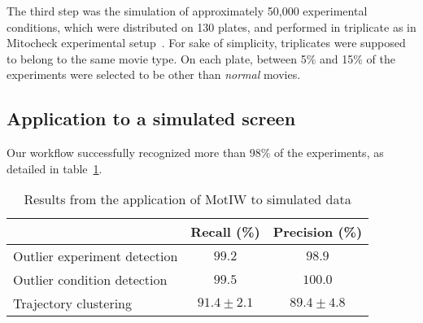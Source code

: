 The third step was the simulation of approximately 50,000 experimental
conditions, which were distributed on 130 plates, and performed in
triplicate as in Mitocheck experimental
setup~\cite{pmid20360735}. For sake of simplicity, triplicates were
supposed to belong to the same movie type. On
each plate, between 5\% and 15\% of the experiments were selected to
be other than \textit{normal} movies. 
%
%


\subsection{Application to a simulated screen}
Our workflow successfully recognized more than 98\% of the experiments, as detailed in table~\ref{simu_results}.
\begin{table}[!ht]
\centering
\caption{Results from the application of MotIW to simulated data\label{simu_results}}
{\begin{tabular}{l|c|c|}
 & Recall (\%)& Precision (\%)\\
\hline
\parbox{5cm}{Outlier experiment detection} & $99.2$ & $98.9$\\
\parbox{5cm}{Outlier condition detection} & $99.5$ & $100.0$\\
\hline
\hline
Trajectory clustering & $91.4\pm2.1$ &  $89.4\pm4.8$\\
\hline
\end{tabular}}{}
\end{table}

